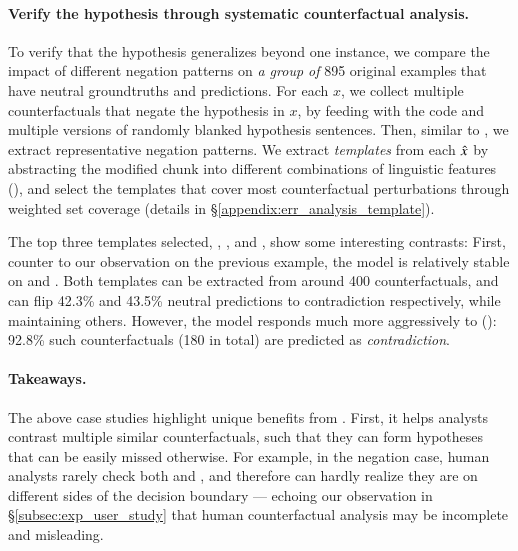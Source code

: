 
\paragraph{Verify the hypothesis through systematic counterfactual analysis.}
To verify that the hypothesis generalizes beyond one instance, we compare the impact of different negation patterns on \emph{a group of} 895 original examples that have neutral groundtruths and predictions.
For each $x$, we collect multiple counterfactuals that negate the hypothesis in $x$, by feeding \sysname with the  code and multiple versions of randomly blanked hypothesis sentences.
Then, similar to \citet{wu2020tempura}, we extract representative negation patterns.
We extract \emph{templates} from each $\hat{x}$ by abstracting the modified chunk into different combinations of linguistic features (\eg {}), and select the templates that cover most counterfactual perturbations through weighted set coverage (details in \S\ref{appendix:err_analysis_template}).

The top three templates selected, , , and , show some interesting contrasts: 
First, counter to our observation on the previous example, the model is relatively stable on  and .
Both templates can be extracted from around 400 counterfactuals, and can flip 42.3\% and 43.5\% neutral predictions to contradiction respectively, while maintaining others.
However, the model responds much more aggressively to  (\eg {}): 92.8\% such counterfactuals (180 in total) are predicted as \emph{contradiction}.


\paragraph{Takeaways.}
The above case studies highlight unique benefits from \sysname.
First, it helps analysts contrast multiple similar counterfactuals, such that they can form hypotheses that can be easily missed otherwise.
For example, in the negation case, human analysts rarely check both  and , and therefore can hardly realize they are on different sides of the decision boundary --- echoing our observation in \S\ref{subsec:exp_user_study} that human counterfactual analysis may be incomplete and misleading.


